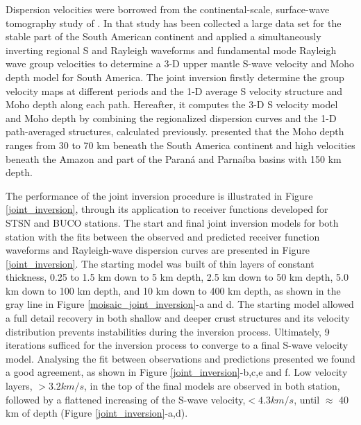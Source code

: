 \documentclass[paper,11pt]{geophysics}
\begin{document}
Dispersion velocities were borrowed from the continental-scale, surface-wave tomography study of \cite{feng_upper_2007}. In that study has been collected a large data set for the stable part of the South American continent and applied a simultaneously inverting regional S and Rayleigh waveforms and fundamental mode Rayleigh wave group velocities to determine a 3-D upper mantle S-wave velocity and Moho depth model for South America. The joint inversion firstly determine the group velocity maps at different periods and the 1-D average S velocity structure and Moho depth along each path. Hereafter, it computes the 3-D S velocity model and Moho depth by combining the regionalized dispersion curves and the 1-D path-averaged structures, calculated previously. \cite{feng_upper_2007} presented that the Moho depth ranges from 30 to 70 km beneath the South America continent and high velocities beneath the Amazon and part of the Paraná and Parnaíba basins with 150 km depth.

The performance of the joint inversion procedure is illustrated in Figure \ref{joint_inversion}, through its application to receiver functions developed for STSN and BUCO stations. The start and final joint inversion models for both station with the fits between the observed and predicted receiver function waveforms and Rayleigh-wave dispersion curves are presented in Figure \ref{joint_inversion}. The starting model was built of thin layers of constant thickness, 0.25 to 1.5 km down to 5 km depth, 2.5 km down to 50 km depth, 5.0 km down to 100 km depth, and 10 km down to 400 km depth, as shown in the gray line in Figure \ref{moisaic_joint_inversion}-a and d. The starting model allowed a full detail recovery in both shallow and deeper crust structures and its velocity distribution prevents instabilities during the inversion process. Ultimately, 9 iterations sufficed for the inversion process to converge to a final S-wave velocity model. Analysing the fit between observations and predictions presented we found a good agreement, as shown in Figure \ref{joint_inversion}-b,c,e and f. Low velocity layers, $>3.2 km/s$, in the top of the final models are observed in both station, followed by a flattened increasing of the S-wave velocity,$<4.3 km/s$, until $\approx$ 40 km of depth (Figure \ref{joint_inversion}-a,d). 
\end{document}
